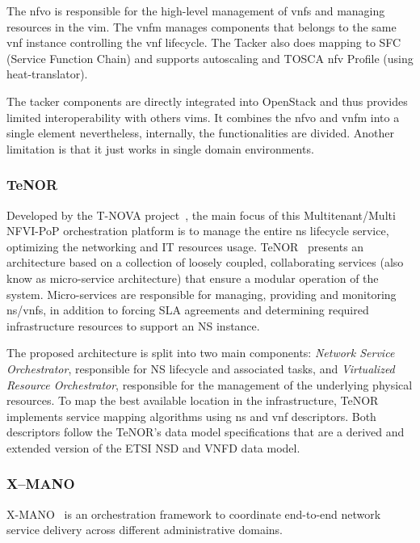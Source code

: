 The \gls{nfvo} is responsible for the high-level management of \glspl{vnf} and managing resources in the \gls{vim}. The \gls{vnfm} manages components that belongs to the same \gls{vnf} instance controlling the \gls{vnf} lifecycle. The Tacker also does mapping to SFC (Service Function Chain) and supports autoscaling and TOSCA \gls{nfv} Profile (using heat-translator).

The tacker components are directly integrated into OpenStack and thus provides limited interoperability with others \glspl{vim}. It combines the \gls{nfvo} and \gls{vnfm} into a single element nevertheless, internally, the functionalities are divided. Another limitation is that it just works in single domain environments.   

\subsubsection{TeNOR}
Developed by the T-NOVA project~\cite{FP7projectT-NOVAT-NOVAInfrastructures}, the main focus of this Multitenant/Multi NFVI-PoP orchestration platform is to manage the entire \gls{ns} lifecycle service, optimizing the networking and IT resources usage. TeNOR~\cite{7502419} presents an architecture based on a collection of loosely coupled, collaborating services (also know as micro-service architecture) that ensure a modular operation of the system. Micro-services are responsible for managing, providing and monitoring \gls{ns}/\glspl{vnf}, in addition to forcing SLA agreements and determining required infrastructure resources to support an NS instance. 

The proposed architecture is split into two main components: \textit{Network Service Orchestrator}, responsible for NS lifecycle and associated tasks, and \textit{Virtualized Resource Orchestrator}, responsible for the management of the underlying physical resources. To map the best available location in the infrastructure, TeNOR implements service mapping algorithms using \gls{ns} and \gls{vnf} descriptors. Both descriptors follow the TeNOR's data model specifications that are a derived and extended version of the ETSI NSD and VNFD data model.

\subsubsection{X--MANO}
X-MANO~\cite{francescon2017x} is an orchestration framework to coordinate end-to-end network service delivery across different administrative domains. 

